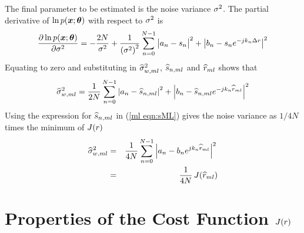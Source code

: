 The final parameter to be estimated is the noise variance ${\sigma^2}$.
The partial derivative of $\ln p(\bm{x};\bm{\theta})$ with respect to
${\sigma^2}$ is
\begin{equation}
\frac{\del\ln p(\md;\uvp)}{\del \nv}
=-\frac{2N}{\nv}+\frac{1}{\left(\nv\right)^2}
\sum_{n=0}^{N-1}
\left|\vphantom{\e{k}}a_n-s_n\right|^2+\left|b_n-s_n\e{-jk_n\dr}\right|^2
\end{equation}
Equating to zero and substituting in $\widehat{\sigma}^2_{{w},ml}$, $\widehat{s}_{n,ml}$ and $\widehat{r}_{ml}$ shows that
\begin{equation}
\widehat{\sigma}^2_{{w},ml}=\frac{1}{2N}\sum_{n=0}^{N-1} 
\left|a_n-\widehat{s}_{n,ml}\right|^2+\left|b_n-\widehat{s}_{n,ml}{e^{-jk_n\widehat{r}_{ml}}}\right|^2
\end{equation}
Using the expression for $\widehat{s}_{n,ml}$ in (\ref{ml eqn:sML}) gives the noise 
variance as $1/4N$ times the minimum of $J({r})$
\begin{eqnarray}
\widehat{\sigma}^2_{{w},ml}
&=&\frac{1}{4N}\sum_{n=0}^{N-1} \left|a_n-b_n{e^{jk_n\widehat{r}_{ml}}}\right|^2{\nonumber}\\
&=&\frac{1}{4N}\,J(\widehat{r}_{ml})		
\label{ml eqn:nvML}
\end{eqnarray}

\section{Properties of the Cost Function $J({r})$}

